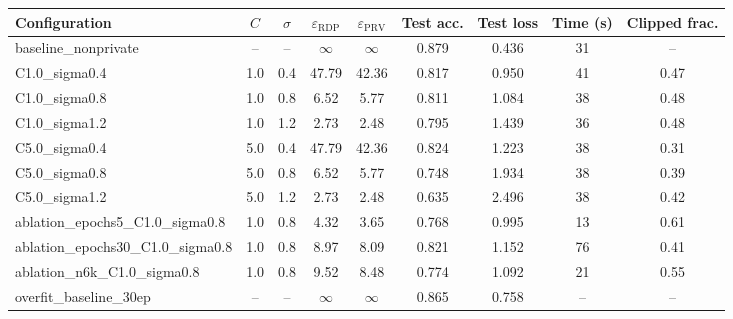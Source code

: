 \setlength{\tabcolsep}{4pt}
\begin{tabular}{lcccccccc}
\toprule
Configuration & $C$ & $\sigma$ & $\varepsilon_{\mathrm{RDP}}$ & $\varepsilon_{\mathrm{PRV}}$ & Test acc. & Test loss & Time (s) & Clipped frac. \\
\midrule
baseline\_nonprivate & -- & -- & $\infty$ & $\infty$ & 0.879 & 0.436 & 31 & -- \\
C1.0\_sigma0.4 & 1.0 & 0.4 & 47.79 & 42.36 & 0.817 & 0.950 & 41 & 0.47 \\
C1.0\_sigma0.8 & 1.0 & 0.8 & 6.52 & 5.77 & 0.811 & 1.084 & 38 & 0.48 \\
C1.0\_sigma1.2 & 1.0 & 1.2 & 2.73 & 2.48 & 0.795 & 1.439 & 36 & 0.48 \\
C5.0\_sigma0.4 & 5.0 & 0.4 & 47.79 & 42.36 & 0.824 & 1.223 & 38 & 0.31 \\
C5.0\_sigma0.8 & 5.0 & 0.8 & 6.52 & 5.77 & 0.748 & 1.934 & 38 & 0.39 \\
C5.0\_sigma1.2 & 5.0 & 1.2 & 2.73 & 2.48 & 0.635 & 2.496 & 38 & 0.42 \\
ablation\_epochs5\_C1.0\_sigma0.8 & 1.0 & 0.8 & 4.32 & 3.65 & 0.768 & 0.995 & 13 & 0.61 \\
ablation\_epochs30\_C1.0\_sigma0.8 & 1.0 & 0.8 & 8.97 & 8.09 & 0.821 & 1.152 & 76 & 0.41 \\
ablation\_n6k\_C1.0\_sigma0.8 & 1.0 & 0.8 & 9.52 & 8.48 & 0.774 & 1.092 & 21 & 0.55 \\
overfit\_baseline\_30ep & -- & -- & $\infty$ & $\infty$ & 0.865 & 0.758 & -- & -- \\
\bottomrule
\end{tabular}
